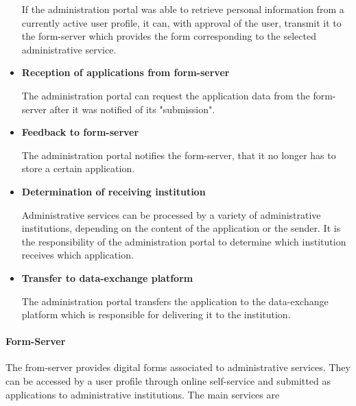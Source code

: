 \documentclass[
     12pt,         %
     a4paper,      %
     BCOR=10mm,version=first,     %
     DIV=14,version=first,        %
     ]{scrreprt}
\begin{document}
\begin{itemize}
    If the administration portal was able to retrieve personal information from a currently active user profile, it can, with approval of the user, transmit it to the form-server which provides the form corresponding to the selected administrative service.
    
    \item \textbf{Reception of applications from form-server}
    
    The administration portal can request the application data from the form-server after it was notified of its "submission".
    
    \item \textbf{Feedback to form-server}
    
    The administration portal notifies the form-server, that it no longer has to store a certain application.

    \item \textbf{Determination of receiving institution}
    
    Administrative services can be processed by a variety of administrative institutions, depending on the content of the application or the sender. It is the responsibility of the administration portal to determine which institution receives which application.
    
    \item \textbf{Transfer to data-exchange platform}
    
    The administration portal transfers the application to the data-exchange platform which is responsible for delivering it to the institution.
\end{itemize}

\paragraph{Form-Server}
The from-server provides digital forms associated to administrative services. They can be accessed by a user profile through online self-service and submitted as applications to administrative institutions. The main services are \cite{dNRW:Standardisierungskonzeptzur}
\end{document}
